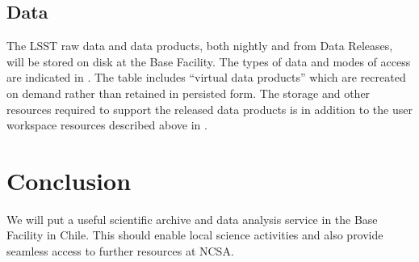 \subsection{Data}
\label{sec:data}

The LSST raw data and data products, both nightly and from Data Releases, will be stored on disk at the Base Facility.
The types of data and modes of access are indicated in . 
The table includes ``virtual data products'' which are recreated on demand rather than retained in persisted form.
The storage and other resources required to support the released data products is in addition to the user workspace resources described above in .




\section{Conclusion}

We will put a useful scientific archive and data analysis service in the Base Facility in Chile.
This should enable local science activities and also provide seamless access to further resources at NCSA.

